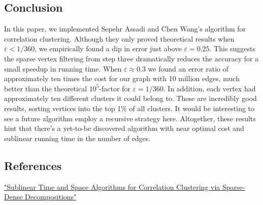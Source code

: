 \documentclass[
]{article}
\begin{document}
\hypertarget{conclusion}{%
\subsection{Conclusion}\label{conclusion}}

In this paper, we implemented Sepehr Assadi and Chen
Wang's algorithm for correlation clustering. Although they only proved theoretical results when $\varepsilon < 1/360$, we empirically found a dip in error just above $\varepsilon = 0.25$. This suggests the sparse vertex filtering from step three dramatically reduces the accuracy for a small speedup in running time. When $\varepsilon\approx 0.3$ we found an error ratio of approximately ten times the cost for our graph with 10 million edges, much better than the theoretical $10^5$-factor for $\varepsilon = 1/360$. In addition, each vertex had approximately ten different clusters it could belong to. These are incredibly good results, sorting vertices into the top 1\% of all clusters. It would be interesting to see a future algorithm employ a recursive strategy here. Altogether, these results hint that there's a yet-to-be discovered algorithm with near optimal cost and sublinear running time in the number of edges.

\hypertarget{references}{%
\subsection{References}\label{references}}

\href{https://doi.org/10.48550/arxiv.2109.14528}{"Sublinear Time and
Space Algorithms for Correlation Clustering via Sparse-Dense
Decompositions"}
\end{document}

